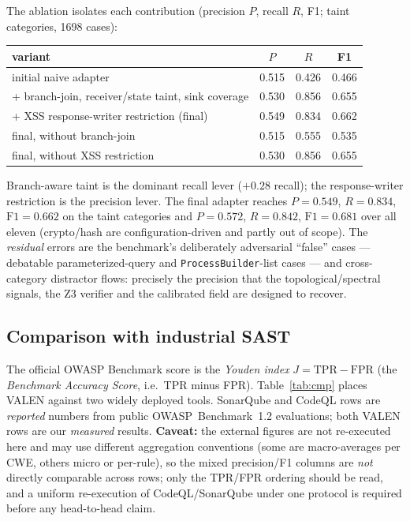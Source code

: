 \documentclass[11pt]{article}
\begin{document}
The ablation isolates each contribution (precision $P$, recall $R$, F1; taint
categories, 1698 cases):
\begin{center}
\begin{tabular}{lccc}
\toprule
variant & $P$ & $R$ & F1 \\
\midrule
initial naive adapter & 0.515 & 0.426 & 0.466 \\
+ branch-join, receiver/state taint, sink coverage & 0.530 & 0.856 & 0.655 \\
+ XSS response-writer restriction (final) & 0.549 & 0.834 & 0.662 \\
\midrule
final, without branch-join & 0.515 & 0.555 & 0.535 \\
final, without XSS restriction & 0.530 & 0.856 & 0.655 \\
\bottomrule
\end{tabular}
\end{center}
Branch-aware taint is the dominant recall lever ($+0.28$ recall); the
response-writer restriction is the precision lever. The final adapter reaches
$P=0.549$, $R=0.834$, $\mathrm{F1}=0.662$ on the taint categories and
$P=0.572$, $R=0.842$, $\mathrm{F1}=0.681$ over all eleven (crypto/hash are
configuration-driven and partly out of scope). The \emph{residual} errors are
the benchmark's deliberately adversarial ``false'' cases --- debatable
parameterized-query and \texttt{ProcessBuilder}-list cases --- and cross-category
distractor flows: precisely the precision that the topological/spectral signals,
the Z3 verifier and the calibrated field are designed to recover.

\subsection{Comparison with industrial SAST}
The official OWASP Benchmark score is the \emph{Youden index}
$J = \text{TPR} - \text{FPR}$ (the \emph{Benchmark Accuracy Score}, i.e.\ TPR
minus FPR). Table~\ref{tab:cmp}
places VALEN against two widely deployed tools. SonarQube and CodeQL rows are
\emph{reported} numbers from public OWASP~Benchmark~1.2 evaluations; both
VALEN rows are our \emph{measured} results. \textbf{Caveat:} the external
figures are not re-executed here and may use different aggregation conventions
(some are macro-averages per CWE, others micro or per-rule), so the mixed
precision/F1 columns are \emph{not} directly comparable across rows; only the
TPR/FPR ordering should be read, and a uniform re-execution of CodeQL/SonarQube
under one protocol is required before any head-to-head claim.
\end{document}
